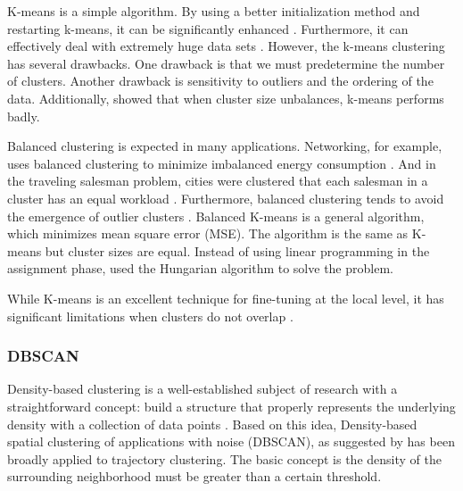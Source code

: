 \documentclass[a4paper, 12pt]{article}
\begin{document}
K-means is a simple algorithm. By using a better initialization method and restarting k-means, it can be significantly enhanced \citep{franti2019much}. Furthermore, it can effectively deal with extremely huge data sets \citep{macqueen1967some, anderberg2014cluster}.  However, the k-means clustering has several drawbacks. One drawback is that we must predetermine the number of clusters. Another drawback is sensitivity to outliers and the ordering of the data. Additionally, \citep{franti2018k} showed that when cluster size unbalances, k-means performs badly. 

Balanced clustering is expected in many applications. Networking, for example, uses balanced clustering to minimize imbalanced energy consumption \citep{siavoshi2016load}. And in the traveling salesman problem, cities were clustered that each salesman in a cluster has an equal workload \citep{nallusamy2010optimization}. Furthermore, balanced clustering tends to avoid the emergence of outlier clusters \citep{zhong2003model}. Balanced K-means \citep{malinen2014balanced} is a general algorithm, which minimizes mean square error (MSE). The algorithm is the same as K-means but cluster sizes are equal. Instead of using linear programming in the assignment phase, \citet{malinen2014balanced} used the Hungarian algorithm \citep{burkard2012assignment} to solve the problem.

While K-means is an excellent technique for fine-tuning at the local level, it has significant limitations when clusters do not overlap \citep{franti2019much}.

\subsubsection{DBSCAN}
Density-based clustering is a well-established subject of research with a straightforward concept: build a structure that properly represents the underlying density with a collection of data points \citep{kriegel2011density}. Based on this idea, Density-based spatial clustering of applications with noise (DBSCAN), as suggested by \cite{ester1996density} has been broadly applied to trajectory clustering. The basic concept is the density of the surrounding neighborhood must be greater than a certain threshold. 
\end{document}

